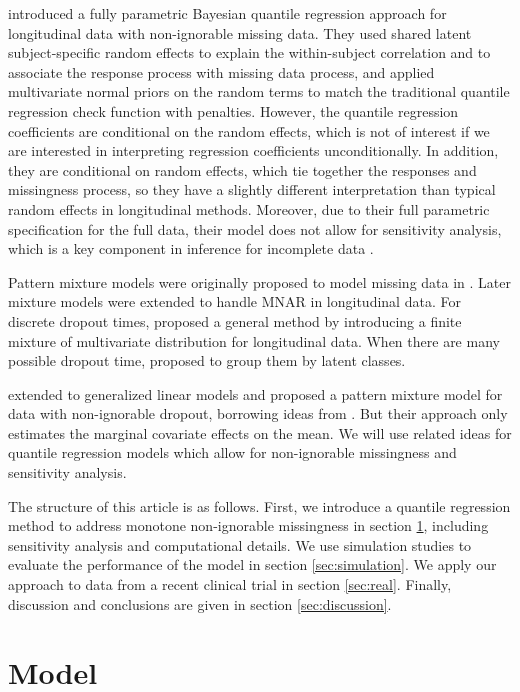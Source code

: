 \documentclass[useAMS,usenatbib,referee]{biom}
\begin{document}
\citet{yuan2010} introduced a fully parametric Bayesian quantile
regression approach for longitudinal data with non-ignorable missing
data. They used shared latent subject-specific random effects to
explain the within-subject correlation and to associate the response
process with missing data process, and applied multivariate normal
priors on the random terms to match the traditional quantile
regression check function with penalties. However, the quantile
regression coefficients are conditional on the random effects, which
is not of interest if we are interested in interpreting regression
coefficients unconditionally.  In addition, they are
conditional on random effects, which tie together the responses and
missingness process, so they have a slightly different interpretation
than typical random effects in longitudinal methods. Moreover, due to
their full parametric specification for the full data, their model
does not allow for sensitivity analysis, which is a key component in
inference for incomplete data \citep{nas2010}.

Pattern mixture models were originally proposed to model missing data
in \citet{rubin1977}. Later mixture models were extended to handle
MNAR in longitudinal data. For discrete dropout times,
\citet{little1993, little1994} proposed a general method by
introducing a finite mixture of multivariate distribution for
longitudinal data. When there are many possible dropout time,
\citet{roy2003} proposed to group them by latent classes.

\citet{roy2008} extended \citet{roy2003} to generalized linear models
and proposed a pattern mixture model for data with non-ignorable
dropout, borrowing ideas from \citet{heagerty1999}.  But their
approach only estimates the marginal covariate effects on the mean. We
will use related ideas for quantile regression models which allow for
non-ignorable missingness and sensitivity analysis.

The structure of this article is as follows. First, we introduce a
quantile regression method to address monotone non-ignorable
missingness in section \ref{sec:model}, including sensitivity analysis
and computational details.  We use simulation studies to evaluate the
performance of the model in section \ref{sec:simulation}. We apply our
approach to data from a recent clinical trial in section
\ref{sec:real}. Finally, discussion and conclusions are given in
section \ref{sec:discussion}.

\section{Model}
\label{sec:model}
\end{document}
